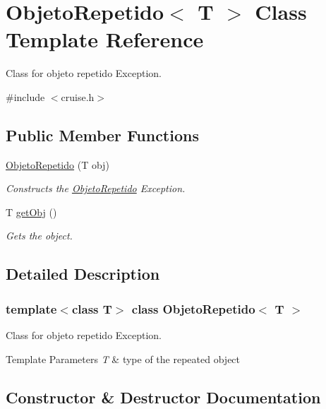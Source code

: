 \hypertarget{classObjetoRepetido}{}\section{Objeto\+Repetido$<$ T $>$ Class Template Reference}
\label{classObjetoRepetido}


Class for objeto repetido Exception.  




{\ttfamily \#include $<$cruise.\+h$>$}

\subsection*{Public Member Functions}
\begin{DoxyCompactItemize}
\item 
\hyperlink{classObjetoRepetido_a0b2c21a82fc9d867e3f50ac8c96c3747}{Objeto\+Repetido} (T obj)
\begin{DoxyCompactList}\small\item\em Constructs the \hyperlink{classObjetoRepetido}{Objeto\+Repetido} Exception. \end{DoxyCompactList}\item 
T \hyperlink{classObjetoRepetido_a269a9ef9b37152cfb4584a224495c06c}{get\+Obj} ()
\begin{DoxyCompactList}\small\item\em Gets the object. \end{DoxyCompactList}\end{DoxyCompactItemize}


\subsection{Detailed Description}
\subsubsection*{template$<$class T$>$\newline
class Objeto\+Repetido$<$ T $>$}

Class for objeto repetido Exception. 


\begin{DoxyTemplParams}{Template Parameters}
{\em T} & type of the repeated object \\
\hline
\end{DoxyTemplParams}


\subsection{Constructor \& Destructor Documentation}
\mbox{\label{classObjetoRepetido_a0b2c21a82fc9d867e3f50ac8c96c3747}} 
